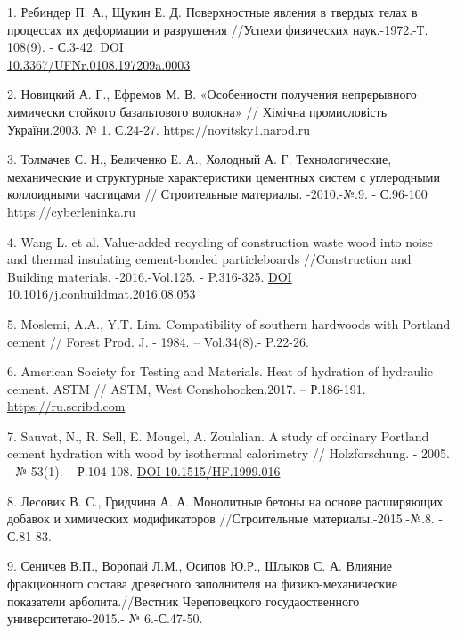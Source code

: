 \begin{references}
1. Ребиндер П. А., Щукин Е. Д. Поверхностные явления в твердых телах в
процессах их деформации и разрушения //Успехи физических наук.-1972.-Т.
108(9). - С.3-42. DOI\\
\href{https://doi.org/10.3367/UFNr.0108.197209a.0003}{10.3367/UFNr.0108.197209a.0003}

2. Новицкий А. Г., Ефремов М. В. «Особенности получения непрерывного
химически стойкого базальтового волокна» // Хімічна промисловість
України.2003. № 1. С.24-27.
\href{https://novitsky1.narod.ru/basalt5.htm}{https://novitsky1.narod.ru}

3. Толмачев С. Н., Беличенко Е. А., Холодный А. Г. Технологические,
механические и структурные характеристики цементных систем с углеродными
коллоидными частицами // Строительные материалы. -2010.-№.9. - С.96-100
\href{https://cyberleninka.ru/article/n/tehnologicheskie-mehanicheskie-i-strukturnye-harakteristiki-tsementnyh-sistem-s-uglerodnymi-kolloidnymi-chastitsami}{https://cyberleninka.ru}

4. Wang L. et al. Value-added recycling of construction waste wood into
noise and thermal insulating cement-bonded particleboards //Construction
and Building materials. -2016.-Vol.125. - P.316-325.
\href{https://doi.org/10.1016/j.conbuildmat.2016.08.053}{DOI
10.1016/j.conbuildmat.2016.08.053}

5. Moslemi, A.A., Y.T. Lim. Compatibility of southern hardwoods with
Portland cement // Forest Prod. J. - 1984. -- Vol.34(8).- P.22-26.

6. American Society for Testing and Materials. Heat of hydration of
hydraulic cement. ASTM // ASTM, West Conshohocken.2017. -- Р.186-191.
\href{https://ru.scribd.com/document/526400532/C186}{https://ru.scribd.com}

7. Sauvat, N., R. Sell, E. Mougel, A. Zoulalian. A study of ordinary
Portland cement hydration with wood by isothermal calorimetry //
Holzforschung. - 2005. - № 53(1). -- Р.104-108.
\href{https://doi.org/10.1515/HF.1999.016}{DOI 10.1515/HF.1999.016}

8. Лесовик В. С., Гридчина А. А. Монолитные бетоны на основе расширяющих
добавок и химических модификаторов //Строительные материалы.-2015.-№.8.
- С.81-83.

9. Сеничев В.П., Воропай Л.М., Осипов Ю.Р., Шлыков С. А. Влияние
фракционного состава древесного заполнителя на физико-механические
показатели арболита.//Вестник Череповецкого госудаоственного
университетаю-2015.- № 6.-С.47-50.


\end{references}
